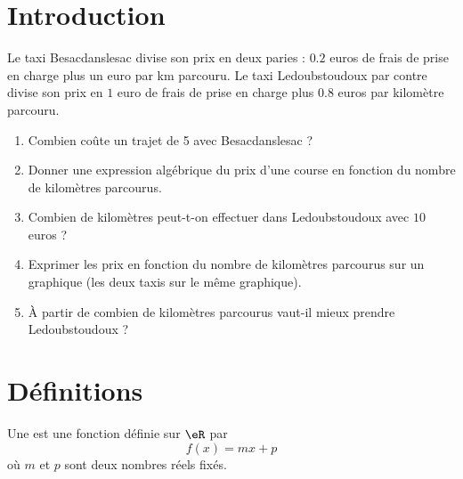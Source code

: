 
\section{Introduction}

\begin{Aprojeter}
    Le taxi Besacdanslesac divise son prix en deux paries : $0.2$ euros de frais de prise en charge plus un euro par km parcouru. Le taxi Ledoubstoudoux par contre divise son prix en $1$ euro de frais de prise en charge plus $0.8$ euros par kilomètre parcouru.

    \begin{enumerate}
        \item
            Combien coûte un trajet de \unit{5}{\kilo\meter} avec Besacdanslesac ?
        \item
            Donner une expression algébrique du prix d'une course en fonction du nombre de kilomètres parcourus.
        \item
            Combien de kilomètres peut-t-on effectuer dans Ledoubstoudoux avec \( 10\) euros ?
        \item
            Exprimer les prix en fonction du nombre de kilomètres parcourus sur un graphique (les deux taxis sur le même graphique).
        \item
            À partir de combien de kilomètres parcourus vaut-il mieux prendre Ledoubstoudoux ?
    \end{enumerate}
\end{Aprojeter}

\section{Définitions}

\begin{definition}
    Une  est une fonction définie sur \( \eR\) par
    \begin{equation}
        f(x)=mx+p
    \end{equation}
    où \( m\) et \( p\) sont deux nombres réels fixés.
\end{definition}

